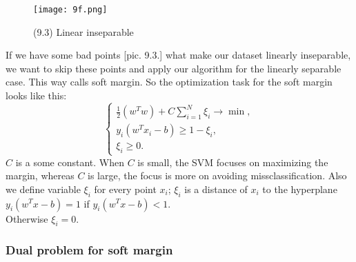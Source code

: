 \begin{wrapfigure}{r}{0.35\linewidth}
  \vspace{-1.4cm}
  \begin{center}
    \texttt{[image: 9f.png]}
  \end{center}
  \vspace{-0.6cm}
  \caption*{(9.3) Linear inseparable}
  \vspace{-0.8cm}
\end{wrapfigure}
If we have some bad points [pic. 9.3.] what make our dataset linearly inseparable, we want to skip these points and apply our algorithm for the linearly separable case. This way calls soft margin. So the optimization task for the soft margin looks like this:
$$\begin{cases}
	\frac{1}{2}(w^Tw)+C\sum\limits_{i=1}^{N}\xi_i\to\min, \\
	y_i(w^Tx_i-b)\ge1-\xi_i, \\
	\xi_i\ge0.
\end{cases}$$
$C$ is a some constant. When $C$ is small, the SVM focuses on maximizing the margin, whereas $C$ is large, the focus is more on avoiding missclassification. Also we define variable $\xi_i$ for every point $x_i$; $\xi_i$ is a distance of $x_i$ to the hyperplane $y_i(w^Tx-b)=1$ if $y_i(w^Tx-b)<1$.\\
Otherwise $\xi_i=0$.

\subsubsection*{Dual problem for soft margin}

